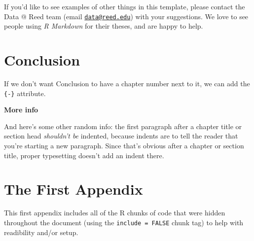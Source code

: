 \documentclass[12pt,twoside]{reedthesis}
\theoremstyle{definition}
\theoremstyle{definition}
\theoremstyle{definition}
\theoremstyle{remark}
\begin{document}
If you'd like to see examples of other things in this template, please
contact the Data @ Reed team (email
\href{mailto:data@reed.edu}{\nolinkurl{data@reed.edu}}) with your
suggestions. We love to see people using \emph{R Markdown} for their
theses, and are happy to help.

\chapter*{Conclusion}\label{conclusion}

If we don't want Conclusion to have a chapter number next to it, we can
add the \texttt{\{-\}} attribute.

\textbf{More info}

And here's some other random info: the first paragraph after a chapter
title or section head \emph{shouldn't be} indented, because indents are
to tell the reader that you're starting a new paragraph. Since that's
obvious after a chapter or section title, proper typesetting doesn't add
an indent there.

\appendix

\chapter{The First Appendix}\label{the-first-appendix}

This first appendix includes all of the R chunks of code that were
hidden throughout the document (using the \texttt{include\ =\ FALSE}
chunk tag) to help with readibility and/or setup.
\end{document}

